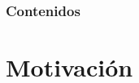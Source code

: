\documentclass[
	spanish, %
	aspectratio=43, %
	hyperref={pdfencoding=auto,psdextra},
	xcolor={dvipsnames,table,usenames},
]{beamer}
\title[\documentsubtitle]{\documenttitle}
\subtitle{\documentsubject}
\author[\documentauthor]{
	\documentauthor \newline\newline
Profesor guía: Richard Weber \newline
Miembros de la comisión: Giorgiogiulio Parra, Ángel Jiménez
}
\institute[UChile]{
	\texttt{[image: \\universitydepartmentimage]} \\
	\medskip
	\universityname \\
	\universityfaculty \\
	\universitydepartment
}
\date[\today]{\footnotesize{\today}}
\begin{document}
\templatePagecfg

\templateFinalcfg

\newcommand\blfootnote[1]{%
  \begingroup
  \renewcommand\thefootnote{}\footnote{#1}%
  \addtocounter{footnote}{-1}%
  \endgroup
}

\begin{frame}
	\titlepage
\end{frame}

\begin{frame}
	\frametitle{Contenidos}
	\tableofcontents
\end{frame}
\section{Motivación}
\end{document}

